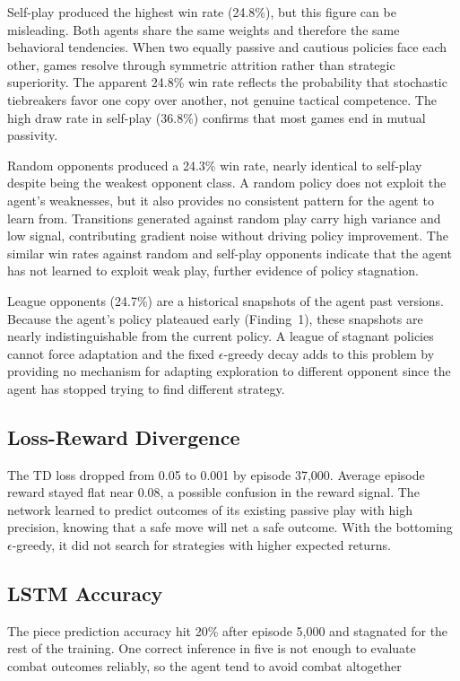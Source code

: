 Self-play produced the highest win rate (24.8\%), but this figure can be misleading. Both agents share the same weights and therefore the same behavioral tendencies. When two equally passive and cautious policies face each other, games resolve through symmetric attrition rather than strategic superiority. The apparent 24.8\% win rate reflects the probability that stochastic tiebreakers favor one copy over another, not genuine tactical competence. The high draw rate in self-play (36.8\%) confirms that most games end in mutual passivity.

Random opponents produced a 24.3\% win rate, nearly identical to self-play despite being the weakest opponent class. A random policy does not exploit the agent's weaknesses, but it also provides no consistent pattern for the agent to learn from. Transitions generated against random play carry high variance and low signal, contributing gradient noise without driving policy improvement. The similar win rates against random and self-play opponents indicate that the agent has not learned to exploit weak play, further evidence of policy stagnation.

League opponents (24.7\%) are a historical snapshots of the agent past versions. Because the agent's policy plateaued early (Finding~1), these snapshots are nearly indistinguishable from the current policy. A league of stagnant policies cannot force adaptation and the fixed $\epsilon$-greedy decay adds to this problem by providing no mechanism for adapting exploration to different opponent since the agent has stopped trying to find different strategy.

\subsection{Loss-Reward Divergence}

The TD loss dropped from 0.05 to 0.001 by episode 37,000. Average episode reward stayed flat near 0.08, a possible confusion in the reward signal. The network learned to predict outcomes of its existing passive play with high precision, knowing that a safe move will net a safe outcome. With the bottoming $\epsilon$-greedy, it did not search for strategies with higher expected returns.

\subsection{LSTM Accuracy}

The piece prediction accuracy hit 20\% after episode 5,000 and stagnated for the rest of the training. One correct inference in five is not enough to evaluate combat outcomes reliably, so the agent tend to avoid combat altogether


